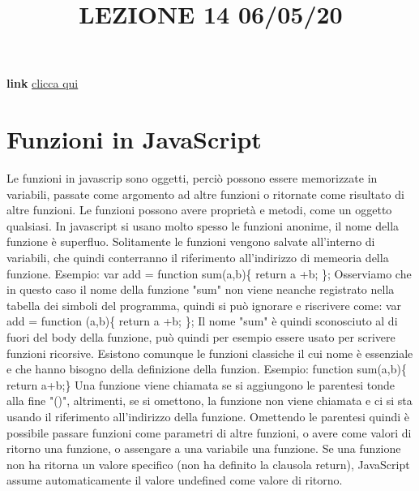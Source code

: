 \title{LEZIONE 14 06/05/20}
\textbf{link} \href{https://web.microsoftstream.com/video/1f9e0781-7149-4a62-851d-de458cb09274?list=user&userId=cfe0965d-9a7c-40e2-be6e-f078296a1914}{clicca qui}
\section{Funzioni in JavaScript}
Le funzioni in javascrip sono oggetti, perciò possono essere memorizzate in variabili, passate come argomento ad altre funzioni o ritornate come risultato di altre funzioni. Le funzioni possono avere proprietà e metodi, come un oggetto qualsiasi.\newline
\newline
In javascript si usano molto spesso le funzioni anonime, il nome della funzione è superfluo. Solitamente le funzioni vengono salvate all'interno di variabili, che quindi conterranno il riferimento all'indirizzo di memeoria della funzione.\newline
Esempio:\newline
var add = function sum(a,b)\{ return a +b; \};\newline
Osserviamo che in questo caso il nome della funzione "sum" non viene neanche registrato nella tabella dei simboli del programma, quindi si può ignorare e riscrivere come:\newline
var add = function (a,b)\{ return a +b; \};\newline
Il nome "sum" è quindi sconosciuto al di fuori del body della funzione, può quindi per esempio essere usato per scrivere funzioni ricorsive.\newline
\newline
Esistono comunque le funzioni classiche il cui nome è essenziale e che hanno bisogno della definizione della funzion.\newline
Esempio:\newline
function sum(a,b)\{ return a+b;\}\newline
\newline
Una funzione viene chiamata se si aggiungono le parentesi tonde alla fine "()", altrimenti, se si omettono, la funzione non viene chiamata e ci si sta usando il riferimento all'indirizzo della funzione. Omettendo le parentesi quindi è possibile passare funzioni come parametri di altre funzioni, o avere come valori di ritorno una funzione, o assengare a una variabile una funzione.\newline
\newline
Se una funzione non ha ritorna un valore specifico (non ha definito la clausola return), JavaScript assume automaticamente il valore undefined come valore di ritorno.\newline
